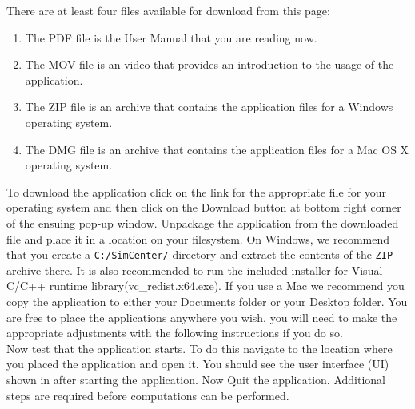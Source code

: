 

There are at least four files available for download from this page: 
\begin{enumerate}
    \item The PDF file is the User Manual that you are reading now.
    \item The MOV file is an video that provides an introduction to the usage of the application.
    \item The ZIP file is an archive that contains the application files for a Windows operating system.
    \item The DMG file is an archive that contains the application files for a Mac OS X operating system.
\end{enumerate}

To download the \texttt{\getsoftwarename{}} application click on the link for
the appropriate file for your operating system and then click on the
Download button at bottom right corner of the ensuing pop-up window. 
Unpackage the application from the downloaded
file and place it in a location on your filesystem. On Windows, we
recommend that you create a \texttt{C:/SimCenter/\getsoftwarename{}}
directory and extract the contents of the \texttt{ZIP} archive
there. It is also recommended to run the included installer for Visual C/C++ runtime library(vc\_redist.x64.exe). 
If you use a Mac we recommend you copy the application to either your
Documents folder or your Desktop folder. You are free to place the
applications anywhere you wish, you will need to make the
appropriate adjustments with the following instructions if you do so. \\

Now test that the application starts. To do this navigate to
the location where you placed the application and open it. You should
see the user interface (UI) shown in  after
starting the application. Now Quit the application. Additional steps are required before 
computations can be performed.\\

